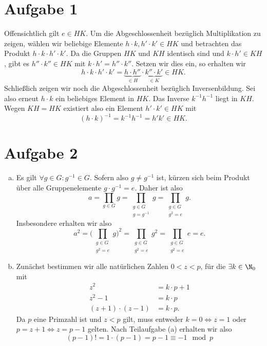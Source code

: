 \documentclass{article}
\begin{document}
\def\headheight{25pt}
    \section*{Aufgabe 1}
    Offensichtlich gilt $e \in HK$. Um die Abgeschlossenheit bezüglich Multiplikation zu zeigen, wählen wir beliebige Elemente $h\cdot k, h'\cdot k' \in HK$ und betrachten das Produkt $h\cdot k \cdot h' \cdot k'$. Da die Gruppen $HK$ und $KH$ identisch sind und $k\cdot h' \in KH$, gibt es $h'' \cdot k''\in HK$ mit $k\cdot h' = h''\cdot k''$. Setzen wir dies ein, so erhalten wir 
    \[h\cdot k \cdot h' \cdot k' = \underbrace{h\cdot h''}_{\in H}\cdot \underbrace{k'' \cdot k'}_{\in K} \in HK.\]
    Schließlich zeigen wir noch die Abgeschlossenheit bezüglich Inversenbildung. Sei also erneut $h \cdot k$ ein beliebiges Element in $HK$. Das Inverse $k^{-1}h^{-1}$ liegt in $KH$. Wegen $KH = HK$ existiert also ein Element $h'\cdot k' \in HK$ mit \[(h\cdot k)^{-1} = k^{-1}h^{-1} = h'k' \in HK.\]
    \section*{Aufgabe 2}
    \begin{enumerate}[(a)]
        \item Es gilt $\forall g \in G: g^{-1} \in G$. Sofern also $g \neq g^{-1}$ ist, kürzen sich beim Produkt über alle Gruppenelemente $g \cdot g^{-1} = e$. Daher ist also
        \[
            a = \prod_{g\in G} g = \prod_{\substack{g\in G\\g= g^{-1}}} g = \prod_{\substack{g\in G\\g^2 = e}} g.
        \]
        Insbesondere erhalten wir also
        \[
            a^2 = \bigg(\prod_{\substack{g\in G\\g^2 = e}} g\bigg)^2 = \prod_{\substack{g\in G\\g^2 = e}} g^2 = \prod_{\substack{g\in G\\g^2 = e}} e = e.
        \]
        \item Zunächst bestimmen wir alle natürlichen Zahlen $0 < z < p$, für die $\exists k \in \N_0$ mit 
        \begin{align*}
            z^2 &= k \cdot p + 1\\
            z^2 -1 &= k \cdot p\\
            (z+1) \cdot (z-1) &= k \cdot p.
        \end{align*}
        Da $p$ eine Primzahl ist und $z < p$ gilt, muss entweder $k = 0 \Leftrightarrow z = 1$ oder $p = z+1 \Leftrightarrow z = p-1$ gelten. Nach Teilaufgabe (a) erhalten wir also
        \[
            (p-1)! = 1 \cdot (p-1) = p-1 \equiv -1 \mod p  
        \]
    \end{enumerate}
\end{document}
